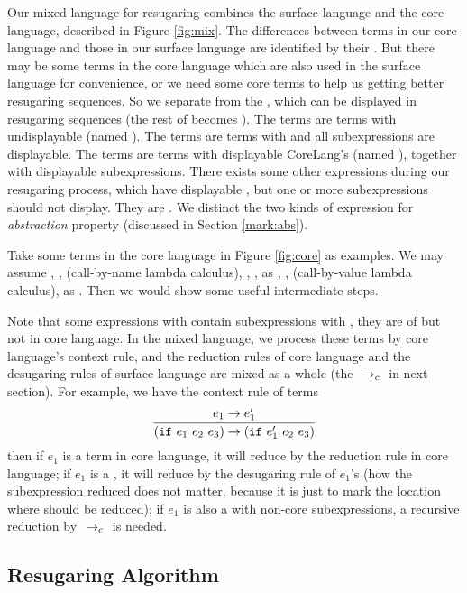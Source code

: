 Our mixed language for resugaring combines the surface language and the core language, described in Figure \ref{fig:mix}.
%
The differences between terms in our core language and those in our surface language are identified by their . But there may be some terms in the core language which are also used in the surface language for convenience, or we need some core terms to help us getting better resugaring sequences. So we separate  from the , which can be displayed in resugaring sequences (the rest of  becomes ). The  terms are terms with undisplayable  (named ). The  terms are terms with  and all subexpressions are displayable. The  terms are terms with displayable CoreLang's  (named ), together with displayable subexpressions. There exists some other expressions during our resugaring process, which have displayable , but one or more subexpressions should not display. They are . We distinct the two kinds of expression for \emph{abstraction} property (discussed in Section \ref{mark:abs}).

Take some terms in the core language in Figure \ref{fig:core} as examples.
We may assume , ,  (call-by-name lambda calculus), , ,  as , ,  (call-by-value lambda calculus),  as . Then we would show some useful intermediate steps.

Note that some expressions with  contain subexpressions with , they are of  but not in core language. In the mixed language, we process these terms by core language's context rule, and the reduction rules of core language and the desugaring rules of surface language are mixed as a whole (the $~\rightarrow_c~$ in next section). For example, we have the context rule of  terms
\[
\infer{(\m{if}~e_1~e_2~e_3) \rightarrow (\m{if}~e_1'~e_2~e_3)}{e_1 \rightarrow e_1'}
\]
then if $e_1$ is a term in core language, it will reduce by the reduction rule in core language; if $e_1$ is a , it will reduce by the desugaring rule of $e_1$'s  (how the subexpression reduced does not matter, because it is just to mark the location where should be reduced); if $e_1$ is also a  with non-core subexpressions, a recursive reduction by $~\rightarrow_c~$ is needed.


\subsection{Resugaring Algorithm}

